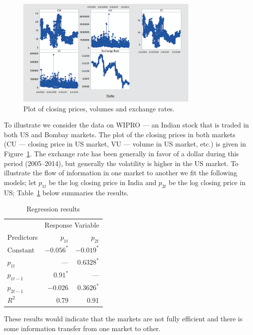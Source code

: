 \begin{figure}[!ht]
   \centering
    \includegraphics[width=0.8\textwidth]{chapters/chapter_stat_ts/figures/cpver.png}
   \caption{Plot of closing prices, volumes and exchange rates. \label{fig:cpver}}
\end{figure}


To illustrate we consider the data on WIPRO --- an Indian stock that is traded in both US and Bombay markets. The plot of the closing prices in both markets (CU --- closing price in US market, VU --- volume in US market, etc.) is given in Figure~\ref{fig:cpver}. The exchange rate has been generally in favor of a dollar during this period (2005--2014), but generally the volatility is higher in the US market. To illustrate the flow of information in one market to another we fit the following models; let $p_{1t}$ be the log closing price in India and $p_{2t}$ be the log closing price in US; Table~\ref{tab:regresul} below summaries the results.
	\begin{table}[!ht] 
	\centering
	\caption{Regression results \label{tab:regresul}}
	\begin{tabular}{l | rr} 
	& \multicolumn{2}{c}{Response Variable} \\ 
	Predictors & $p_{1t}$ & $p_{2t}$ \\ \hline 
	Constant & $-0.056^*$ & $-0.019^*$ \\
	$p_{1t}$ & ---  & $0.6328^*$ \\
	$p_{1t-1}$ & $0.91^*$ & --- \\
	$p_{2t-1}$ & $-0.026$ & $0.3626^*$ \\ \hline
	$R^2$ & 0.79 & 0.91 
	\end{tabular}
	\end{table}
These results would indicate that the markets are not fully efficient and there is some information transfer from one market to other. 

















